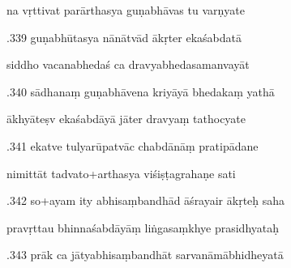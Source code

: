 \documentclass[article,12pt,a4paper]{memoir}%
\newcounter{parCount}
\begin{document}
	  
	  \pstart \leavevmode%
	na vṛttivat parārthasya guṇabhāvas tu varṇyate 
	{}
	\pend%
      

	  
	  \pstart {}.339 guṇabhūtasya nānātvād ākṛter ekaśabdatā 
	{}
	\pend%
      

	  
	  \pstart \leavevmode%
	siddho vacanabhedaś ca dravyabhedasamanvayāt 
	{}
	\pend%
      

	  
	  \pstart {}.340 sādhanaṃ guṇabhāvena kriyāyā bhedakaṃ yathā 
	{}
	\pend%
      

	  
	  \pstart \leavevmode%
	ākhyāteṣv ekaśabdāyā jāter dravyaṃ tathocyate 
	{}
	\pend%
      

	  
	  \pstart {}.341 ekatve tulyarūpatvāc chabdānāṃ pratipādane 
	{}
	\pend%
      

	  
	  \pstart \leavevmode%
	nimittāt tadvato+arthasya viśiṣṭagrahaṇe sati 
	{}
	\pend%
      

	  
	  \pstart {}.342 so+ayam ity abhisaṃbandhād āśrayair ākṛteḥ saha 
	{}
	\pend%
      

	  
	  \pstart \leavevmode%
	pravṛttau bhinnaśabdāyāṃ liṅgasaṃkhye prasidhyataḥ 
	{}
	\pend%
      

	  
	  \pstart {}.343 prāk ca jātyabhisaṃbandhāt   sarvanāmābhidheyatā 
	{}
	\pend%
      
\end{document}

